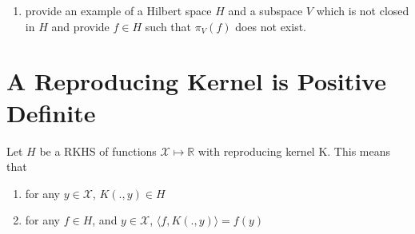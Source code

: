 \documentclass{article}[12pt]
\begin{document}
\begin{enumerate}
\item provide an example of a Hilbert space $H$ and a subspace $V$ which is not closed in $H$ and provide $f \in H$ such that $\pi_V(f)$ does not exist. 
\end{enumerate}

\section{A Reproducing Kernel is Positive Definite}
Let $H$ be a RKHS of functions $\mathcal{X} \mapsto \mathbb{R}$ with reproducing kernel K. This means that 
\begin{enumerate}
\item for any $y \in \mathcal{X}$, $K(.,y) \in H$
\item for any $f \in H$, and $y \in \mathcal{X}$, $\langle f, K(.,y) \rangle = f(y)$
\end{enumerate}
\end{document}
